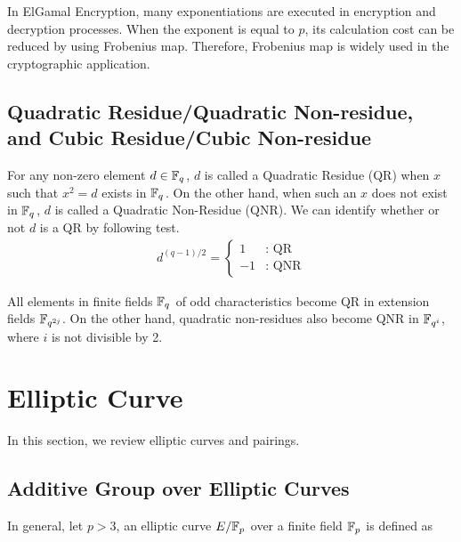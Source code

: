 In ElGamal Encryption, many exponentiations are executed in encryption and decryption processes.
When the exponent is equal to $p$, its calculation cost can be reduced by using Frobenius map.
Therefore, Frobenius map is widely used in the cryptographic application.     

\subsection{Quadratic Residue/Quadratic Non-residue, \\and Cubic Residue/Cubic Non-residue}

For any non-zero element $d\in{\mathbb{F}}_{q^{}}$, $d$ is called a Quadratic Residue (QR) when $x$ such that $x^2=d$ exists in ${\mathbb{F}}_{q^{}}$.
On the other hand, when such an $x$ does not exist in ${\mathbb{F}}_{q^{}}$, $d$ is called a Quadratic Non-Residue (QNR).
We can identify whether or not $d$ is a QR by following test.
\begin{eqnarray}
d^{(q-1)/2} = \left\{
\begin{array}{ll}
1 & \mbox{: QR} \\
-1 & \mbox{: QNR} 
\end{array}
\right.
\end{eqnarray}

All elements in finite fields ${\mathbb{F}}_{q^{}}$ of odd characteristics become QR in extension fields ${\mathbb{F}}_{q^{2j}}$.
On the other hand, quadratic non-residues also become QNR in ${\mathbb{F}}_{q^{i}}$, where $i$ is not divisible by 2.

\section{Elliptic Curve}
In this section, we review elliptic curves and pairings. 

\subsection{Additive Group over Elliptic Curves}

In general, let $p>3$, an elliptic curve $E/{\mathbb{F}}_{p^{}}$ over a finite field ${\mathbb{F}}_{p^{}}$ is defined as 

